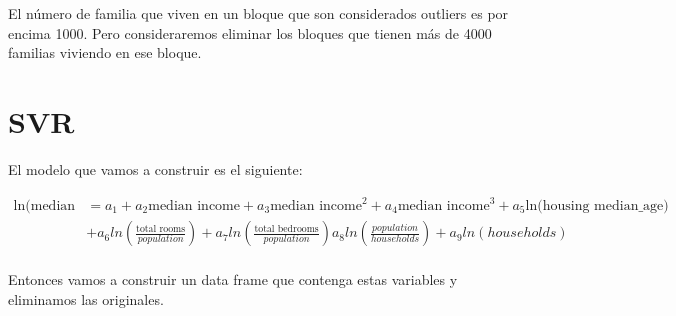 \documentclass[
]{article}
\newenvironment{Shaded}{\begin{snugshade}}{\end{snugshade}}
\newcommand{\DecValTok}[1]{\textcolor[rgb]{0.00,0.00,0.81}{#1}}
\newcommand{\KeywordTok}[1]{\textcolor[rgb]{0.13,0.29,0.53}{\textbf{#1}}}
\newcommand{\NormalTok}[1]{#1}
\newcommand{\OperatorTok}[1]{\textcolor[rgb]{0.81,0.36,0.00}{\textbf{#1}}}
\newcommand{\StringTok}[1]{\textcolor[rgb]{0.31,0.60,0.02}{#1}}
\begin{document}
El número de familia que viven en un bloque que son considerados
outliers es por encima 1000. Pero consideraremos eliminar los bloques
que tienen más de 4000 familias viviendo en ese bloque.

\begin{Shaded}
\end{Shaded}

\hypertarget{svr}{%
\section{SVR}\label{svr}}

El modelo que vamos a construir es el siguiente:

\[\begin{equation*}
        \begin{split}
            \mbox{ln(median house value)} &= a_1 + a_2\mbox{median income} + a_3\mbox{median income}^2 + a_4\mbox{median income}^3 + a_5\mbox{ln(housing median_age)} \\
            & + a_6ln(\frac{\mbox{total rooms}}{population}) + a_7ln(\frac{\mbox{total bedrooms}}{population}) a_8ln(\frac{population}{households}) + a_9ln(households)\\
        \end{split}
\end{equation*}\]

Entonces vamos a construir un data frame que contenga estas variables y
eliminamos las originales.
\end{document}
